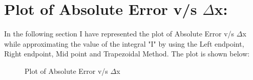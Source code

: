 \documentclass[12pt,a4paper]{article}
\begin{document}
\section{Plot of Absolute Error v/s $\Delta$x:}
In the following section I have represented the plot of Absolute Error v/s $\Delta$x while approximating the value of the integral "I" by using the Left endpoint, Right endpoint, Mid point and Trapezoidal Method. The plot is shown below:
\begin{figure}[!ht]
	\begin{center}
	\end{center}
	\caption{Plot of Absolute Error v/s $\Delta$x}
\end{figure}
\end{document}
